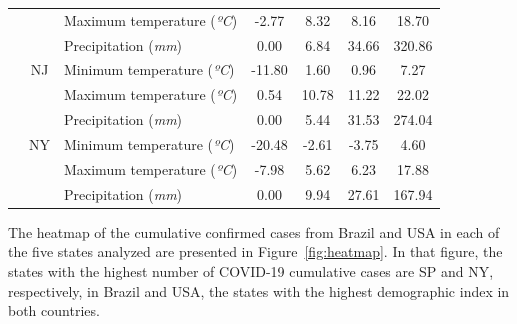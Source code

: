 \begin{scriptsize}
\begin{center}
\begin{longtable}[htb!]{cclcccc}
 &  & Maximum temperature (\textit{ºC}) & -2.77 & 8.32 & 8.16 & 18.70 \\
 &  & Precipitation (\textit{mm}) & 0.00 & 6.84 & 34.66 & 320.86 \\ \cline{2-7}
 & \ac{NJ} & Minimum temperature (\textit{ºC}) & -11.80 & 1.60 & 0.96 & 7.27 \\
 &  & Maximum temperature (\textit{ºC}) & 0.54 & 10.78 & 11.22 & 22.02 \\
 &  & Precipitation (\textit{mm}) & 0.00 & 5.44 & 31.53 & 274.04 \\ \cline{2-7}
 & \ac{NY} & Minimum temperature (\textit{ºC}) & -20.48 & -2.61 & -3.75 & 4.60 \\
 &  & Maximum temperature (\textit{ºC}) & -7.98 & 5.62 & 6.23 & 17.88 \\
 &  & Precipitation (\textit{mm}) & 0.00 & 9.94 & 27.61 & 167.94 \\ \hline
\end{longtable}
\end{center}
\end{scriptsize}

The heatmap of the cumulative confirmed cases from Brazil and \ac{USA} in each of the five states analyzed are presented in Figure~\ref{fig:heatmap}. In that figure, the states with the highest number of \ac{COVID-19} cumulative cases are \ac{SP} and \ac{NY}, respectively, in Brazil and \ac{USA}, the states with the highest demographic index in both countries.

